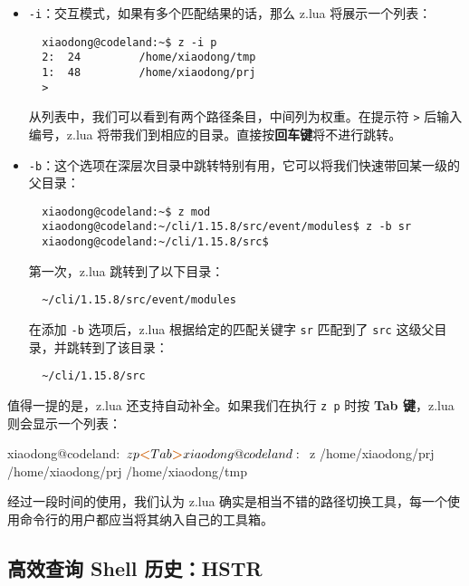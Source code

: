 \documentclass[]{ctexbook}
\newenvironment{Shaded}{\begin{snugshade}}{\end{snugshade}}
\newcommand{\ExtensionTok}[1]{#1}
\newcommand{\NormalTok}[1]{#1}
\newcommand{\OperatorTok}[1]{\textcolor[rgb]{0.81,0.36,0.00}{\textbf{#1}}}
\begin{document}
\begin{itemize}
\item
  \texttt{-i}：交互模式，如果有多个匹配结果的话，那么 z.lua 将展示一个列表：

\begin{verbatim}
  xiaodong@codeland:~$ z -i p
  2:  24         /home/xiaodong/tmp
  1:  48         /home/xiaodong/prj
  >
\end{verbatim}

  从列表中，我们可以看到有两个路径条目，中间列为权重。在提示符 \texttt{\textgreater{}} 后输入编号，z.lua 将带我们到相应的目录。直接按\textbf{回车键}将不进行跳转。
\item
  \texttt{-b}：这个选项在深层次目录中跳转特别有用，它可以将我们快速带回某一级的父目录：

\begin{verbatim}
  xiaodong@codeland:~$ z mod
  xiaodong@codeland:~/cli/1.15.8/src/event/modules$ z -b sr
  xiaodong@codeland:~/cli/1.15.8/src$
\end{verbatim}

  第一次，z.lua 跳转到了以下目录：

\begin{verbatim}
  ~/cli/1.15.8/src/event/modules
\end{verbatim}

  在添加 \texttt{-b} 选项后，z.lua 根据给定的匹配关键字 \texttt{sr} 匹配到了 \texttt{src} 这级父目录，并跳转到了该目录：

\begin{verbatim}
  ~/cli/1.15.8/src
\end{verbatim}
\end{itemize}

值得一提的是，z.lua 还支持自动补全。如果我们在执行 \texttt{z\ p} 时按 \textbf{Tab 键}，z.lua 则会显示一个列表：

\begin{Shaded}
\begin{Highlighting}[]
\ExtensionTok{xiaodong@codeland}\NormalTok{:~$ z p}\OperatorTok{<}\NormalTok{Tab}\OperatorTok{>}
\ExtensionTok{xiaodong@codeland}\NormalTok{:~$ z /home/xiaodong/prj}
\ExtensionTok{/home/xiaodong/prj}\NormalTok{  /home/xiaodong/tmp}
\end{Highlighting}
\end{Shaded}

经过一段时间的使用，我们认为 z.lua 确实是相当不错的路径切换工具，每一个使用命令行的用户都应当将其纳入自己的工具箱。

\hypertarget{ux9ad8ux6548ux67e5ux8be2-shell-ux5386ux53f2hstr}{%
\subsection{高效查询 Shell 历史：HSTR}\label{ux9ad8ux6548ux67e5ux8be2-shell-ux5386ux53f2hstr}}
\end{document}
